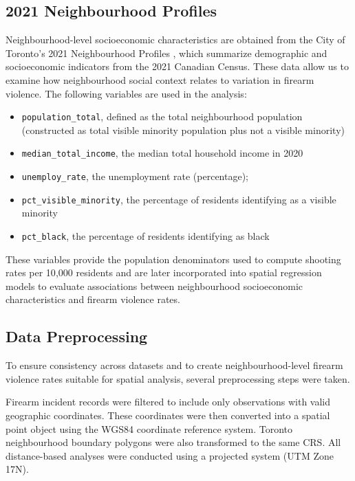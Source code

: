 \documentclass{article}
\begin{document}
\subsection{2021 Neighbourhood Profiles}

\noindent \noindent Neighbourhood-level socioeconomic characteristics are obtained from the City of Toronto’s 2021 Neighbourhood Profiles \citep{city_toronto_neighbourhood_profiles}, which summarize demographic and socioeconomic indicators from the 2021 Canadian Census. These data allow us to examine how neighbourhood social context relates to variation in firearm violence. The following variables are used in the analysis:
\begin{itemize}
    \item \texttt{population\_total}, defined as the total neighbourhood population (constructed as total visible minority population plus not a visible minority)
    \item \texttt{median\_total\_income}, the median total household income in 2020
    \item \texttt{unemploy\_rate}, the unemployment rate (percentage);
    \item \texttt{pct\_visible\_minority}, the percentage of residents identifying as a visible minority
    \item \texttt{pct\_black}, the percentage of residents identifying as black
\end{itemize}

\noindent These variables provide the population denominators used to compute shooting rates per 10{,}000 residents and are later incorporated into spatial regression models to evaluate associations between neighbourhood socioeconomic characteristics and firearm violence rates.

\subsection{Data Preprocessing}

\noindent To ensure consistency across datasets and to create neighbourhood-level firearm violence rates suitable for spatial analysis, several preprocessing steps were taken.

\noindent Firearm incident records were filtered to include only observations with valid geographic coordinates. These coordinates were then converted into a spatial point object using the WGS84 coordinate reference system. Toronto neighbourhood boundary polygons were also transformed to the same CRS. All distance-based analyses were conducted using a projected system (UTM Zone 17N).
\end{document}
